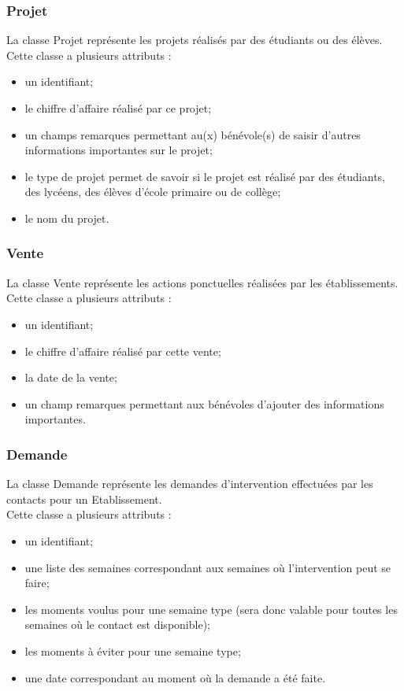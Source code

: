 \subsubsection*{Projet}
La classe Projet représente les projets réalisés par des étudiants ou des élèves.\\
Cette classe a plusieurs attributs : 
\begin{itemize}
\item un identifiant;
\item le chiffre d'affaire réalisé par ce projet;
\item un champs remarques permettant au(x) bénévole(s) de saisir d'autres informations importantes sur le projet;
\item le type de projet permet de savoir si le projet est réalisé par des étudiants, des lycéens, des élèves d'école primaire ou de collège;
\item le nom du projet.
\end{itemize}

\subsubsection*{Vente}
La classe Vente représente les actions ponctuelles réalisées par les établissements.\\ 
Cette classe a plusieurs attributs : 
\begin{itemize}
\item un identifiant; 
\item le chiffre d'affaire réalisé par cette vente;
\item la date de la vente;
\item un champ remarques permettant aux bénévoles d'ajouter des informations importantes. 
\end{itemize}

\subsubsection*{Demande}

La classe Demande représente les demandes d'intervention effectuées par les contacts pour un Etablissement.\\
Cette classe a plusieurs attributs :
\begin{itemize}
\item un identifiant;
\item une liste des semaines correspondant aux semaines où l'intervention peut se faire; 
\item les moments voulus pour une semaine type (sera donc valable pour toutes les semaines où le contact est disponible);
\item les moments à éviter pour une semaine type;
\item une date correspondant au moment où la demande a été faite.
\end{itemize}

